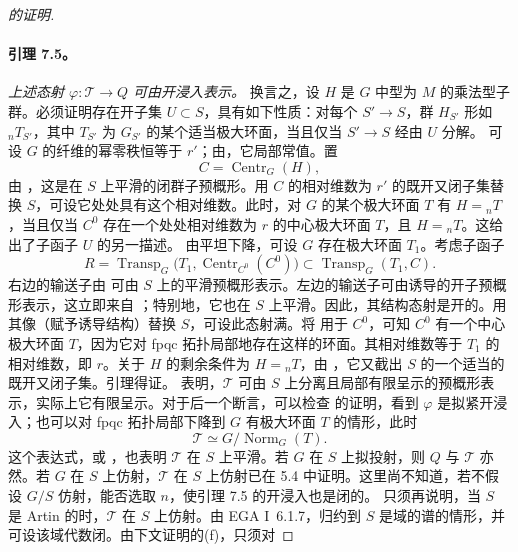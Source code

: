 \begin{proof}[ 的证明]
\paragraph{\textbf{引理 7.5。}}
\emph{上述态射 \(\varphi:\mathcal T\to Q\) 可由开浸入表示。}
换言之，设 \(H\) 是 \(G\) 中型为 \(M\) 的乘法型子群。必须证明存在开子集 \(U\subset S\)，具有如下性质：对每个 \(S'\to S\)，群 \(H_{S'}\) 形如 \({}_nT_{S'}\)，其中 \(T_{S'}\) 为 \(G_{S'}\) 的某个适当极大环面，当且仅当 \(S'\to S\) 经由 \(U\) 分解。
可设 \(G\) 的纤维的幂零秩恒等于 \(r'\)；由\textup{}，它局部常值。置
\[
  C=\operatorname{Centr}_G(H),
\]
由 ，这是在 \(S\) 上平滑的闭群子预概形。用 \(C\) 的相对维数为 \(r'\) 的既开又闭子集替换 \(S\)，可设它处处具有这个相对维数。此时，对 \(G\) 的某个极大环面 \(T\) 有 \(H={}_nT\)，当且仅当 \(C^0\) 存在一个处处相对维数为 \(r\) 的中心极大环面 \(T\)，且 \(H={}_nT\)。这给出了子函子 \(U\) 的另一描述。
由平坦下降，可设 \(G\) 存在极大环面 \(T_1\)。考虑子函子
\[
  R=
  \operatorname{Transp}_G
  \bigl(T_1,\operatorname{Centr}_{C^0}(C^0)\bigr)
  \subset
  \operatorname{Transp}_G(T_1,C).
\]
右边的输送子由  可由 \(S\) 上的平滑预概形表示。左边的输送子可由诱导的开子预概形表示，这立即来自 ；特别地，它也在 \(S\) 上平滑。因此，其结构态射是开的。用其像（赋予诱导结构）替换 \(S\)，可设此态射满。将  用于 \(C^0\)，可知 \(C^0\) 有一个中心极大环面 \(T\)，因为它对 fpqc 拓扑局部地存在这样的环面。其相对维数等于 \(T_1\) 的相对维数，即 \(r\)。关于 \(H\) 的剩余条件为 \(H={}_nT\)，由 ，它又截出 \(S\) 的一个适当的既开又闭子集。引理得证。
 表明，\(\mathcal T\) 可由 \(S\) 上分离且局部有限呈示的预概形表示，实际上它有限呈示。对于后一个断言，可以检查 的证明，看到 \(\varphi\) 是拟紧开浸入；也可以对 fpqc 拓扑局部下降到 \(G\) 有极大环面 \(T\) 的情形，此时
\[
  \mathcal T\simeq G/\operatorname{Norm}_G(T).
\]
这个表达式，或 ，也表明 \(\mathcal T\) 在 \(S\) 上平滑。若 \(G\) 在 \(S\) 上拟投射，则 \(Q\) 与 \(\mathcal T\) 亦然。若 \(G\) 在 \(S\) 上仿射，\(\mathcal T\) 在 \(S\) 上仿射已在 5.4 中证明。这里尚不知道，若不假设 \(G/S\) 仿射，能否选取 \(n\)，使引理 7.5 的开浸入也是闭的。
只须再说明，当 \(S\) 是 Artin 的时，\(\mathcal T\) 在 \(S\) 上仿射。由 EGA I~6.1.7，归约到 \(S\) 是域的谱的情形，并可设该域代数闭。由下文证明的\textup{(f)}，只须对

\end{proof}
